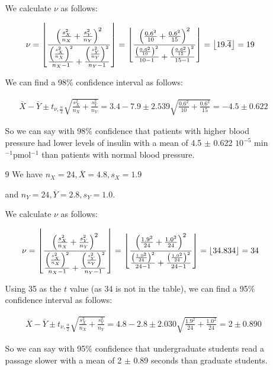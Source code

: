 \documentclass[12pt,letterpaper]{article}
\DeclarePairedDelimiter\floor{\lfloor}{\rfloor}
\begin{document}
\begin{enumerate}
\begin{enumerate}
          We calculate $\nu$ as follows:

          \[
            \nu = \floor*{\frac{\left(\frac{s_X^2}{n_X} + \frac{s_Y^2}{n_Y}\right)^2}{\frac{\left(\frac{s_X^2}{n_X}\right)^2}{n_X - 1} + \frac{\left(\frac{s_Y^2}{n_Y}\right)^2}{n_Y - 1}}} =
            \floor*{\frac{\left(\frac{0.6^2}{10} + \frac{0.6^2}{15}\right)^2}{\frac{\left(\frac{0.6^2}{10}\right)^2}{10 - 1} + \frac{\left(\frac{0.6^2}{15}\right)^2}{15 - 1}}} =
            \floor*{19.\overline{4}} = 19
          \]

          We can find a 98\% confidence interval as follows:

          \begin{align*}
            & \overline{X} - \overline{Y} \pm t_{\nu, \frac{\alpha}{2}} \sqrt{\frac{s_X^2}{n_X} + \frac{s_Y^2}{n_Y}} =
            3.4 - 7.9 \pm 2.539 \sqrt{\frac{0.6^2}{10} + \frac{0.6^2}{15}} = -4.5 \pm 0.622
          \end{align*}

          So we can say with 98\% confidence that patients with higher blood pressure had lower levels of insulin with a mean of 4.5 $\pm$ 0.622 $10^{-5}$ min$^{-1}$pmol$^{-1}$ than patients with normal blood pressure.
        \item [9]
          We have $n_X = 24, \overline{X} = 4.8,  s_X = 1.9$

          and $n_Y = 24, \overline{Y} = 2.8, s_Y = 1.0$.

          We calculate $\nu$ as follows:

          \[
            \nu = \floor*{\frac{\left(\frac{s_X^2}{n_X} + \frac{s_Y^2}{n_Y}\right)^2}{\frac{\left(\frac{s_X^2}{n_X}\right)^2}{n_X - 1} + \frac{\left(\frac{s_Y^2}{n_Y}\right)^2}{n_Y - 1}}} =
            \floor*{\frac{\left(\frac{1.9^2}{24} + \frac{1.0^2}{24}\right)^2}{\frac{\left(\frac{1.9^2}{24}\right)^2}{24 - 1} + \frac{\left(\frac{1.0^2}{24}\right)^2}{24 - 1}}} =
            \floor*{34.834} = 34
          \]

          Using 35 as the $t$ value (as 34 is not in the table),
          we can find a 95\% confidence interval as follows:

          \begin{align*}
            & \overline{X} - \overline{Y} \pm t_{\nu, \frac{\alpha}{2}} \sqrt{\frac{s_X^2}{n_X} + \frac{s_Y^2}{n_Y}} =
            4.8 - 2.8 \pm 2.030 \sqrt{\frac{1.9^2}{24} + \frac{1.0^2}{24}} = 2 \pm 0.890
          \end{align*}

          So we can say with 95\% confidence that undergraduate students read a passage slower with a mean of 2 $\pm$ 0.89 seconds than graduate students.
      \end{enumerate}
  \end{enumerate}
\end{document}
